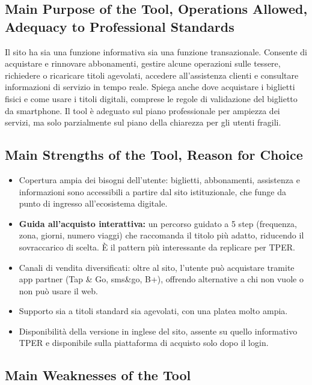 ﻿\documentclass[11pt,a4paper]{article}
\begin{document}
\subsection*{Main Purpose of the Tool, Operations Allowed, Adequacy to Professional Standards}

\noindent Il sito ha sia una funzione informativa sia una funzione transazionale. Consente di acquistare e rinnovare abbonamenti, gestire alcune operazioni sulle tessere, richiedere o ricaricare titoli agevolati, accedere all’assistenza clienti e consultare informazioni di servizio in tempo reale. Spiega anche dove acquistare i biglietti fisici e come usare i titoli digitali, comprese le regole di validazione del biglietto da smartphone. Il tool è adeguato sul piano professionale per ampiezza dei servizi, ma solo parzialmente sul piano della chiarezza per gli utenti fragili. 

\subsection*{Main Strengths of the Tool, Reason for Choice}

\begin{itemize}
    \item Copertura ampia dei bisogni dell'utente: biglietti, abbonamenti,
    assistenza e informazioni sono accessibili a partire dal sito
    istituzionale, che funge da punto di ingresso all'ecosistema digitale.
    \item \textbf{Guida all'acquisto interattiva:} un percorso guidato a
    5 step (frequenza, zona, giorni, numero viaggi) che raccomanda il
    titolo più adatto, riducendo il sovraccarico di scelta. È il pattern
    più interessante da replicare per TPER.
    \item Canali di vendita diversificati: oltre al sito, l'utente può
    acquistare tramite app partner (Tap \& Go, sms\&go, B+), offrendo
    alternative a chi non vuole o non può usare il web.
    \item Supporto sia a titoli standard sia agevolati, con una platea
    molto ampia.
    \item Disponibilità della versione in inglese del sito, assente su
    quello informativo TPER e disponibile sulla piattaforma di acquisto
    solo dopo il login.
\end{itemize}

\subsection*{Main Weaknesses of the Tool}
\end{document}
